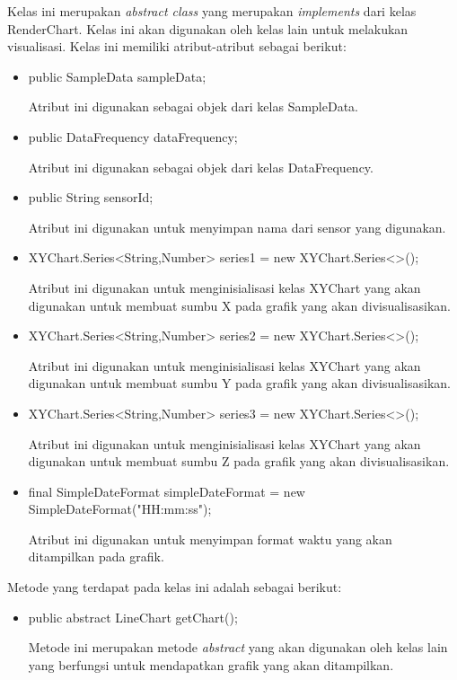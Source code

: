 Kelas ini merupakan \textit{abstract class} yang merupakan \textit{implements} dari kelas RenderChart. Kelas ini akan digunakan oleh kelas lain untuk melakukan visualisasi. Kelas ini memiliki atribut-atribut sebagai berikut:
\begin{itemize}
    \item public SampleData sampleData;
    
    Atribut ini digunakan sebagai objek dari kelas SampleData.
    
    \item public DataFrequency dataFrequency;
    
    Atribut ini digunakan sebagai objek dari kelas DataFrequency.
    
    \item public String sensorId;
    
    Atribut ini digunakan untuk menyimpan nama dari sensor yang digunakan.
    
    \item XYChart.Series<String,Number> series1 = new XYChart.Series<>();
    
    Atribut ini digunakan untuk menginisialisasi kelas XYChart yang akan digunakan untuk membuat sumbu X pada grafik yang akan divisualisasikan.
    
    \item XYChart.Series<String,Number> series2 = new XYChart.Series<>();
    
    Atribut ini digunakan untuk menginisialisasi kelas XYChart yang akan digunakan untuk membuat sumbu Y pada grafik yang akan divisualisasikan.
    
    \item XYChart.Series<String,Number> series3 = new XYChart.Series<>();
    
    Atribut ini digunakan untuk menginisialisasi kelas XYChart yang akan digunakan untuk membuat sumbu Z pada grafik yang akan divisualisasikan.
    
    \item final SimpleDateFormat simpleDateFormat = new SimpleDateFormat("HH:mm:ss");
    
    Atribut ini digunakan untuk menyimpan format waktu yang akan ditampilkan pada grafik.
\end{itemize}

Metode yang terdapat pada kelas ini adalah sebagai berikut:
\begin{itemize}
    \item public abstract LineChart getChart();
    
    Metode ini merupakan metode \textit{abstract} yang akan digunakan oleh kelas lain yang berfungsi untuk mendapatkan grafik yang akan ditampilkan.
\end{itemize}


